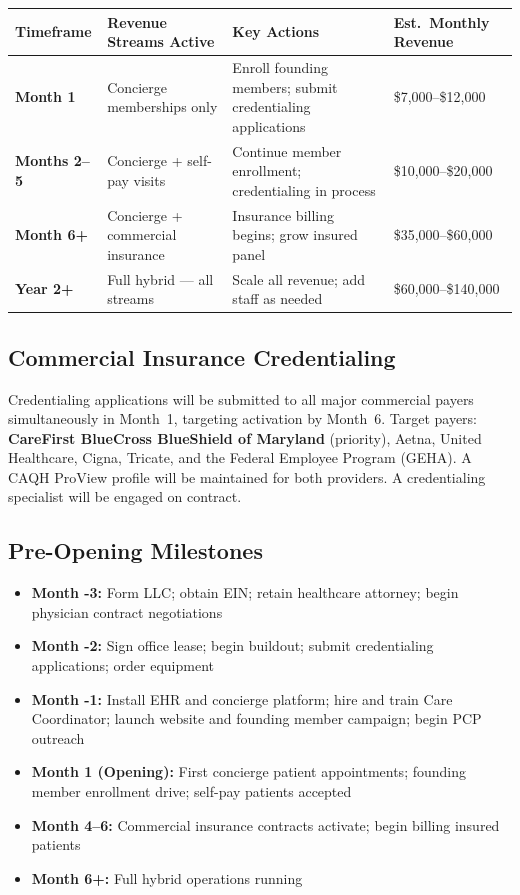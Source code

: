 \documentclass[11pt,letterpaper]{article}
\newcommand{\thead}[1]{\cellcolor{navy}\color{white}\bfseries\small #1}
\newcommand{\trow}{\rowcolor{rowshade}}
\begin{document}
\vspace{6pt}
\begin{tabularx}{\linewidth}{|>{\bfseries\small}p{2.0cm}|>{\small}p{3.2cm}|>{\small}X|>{\small}p{2.4cm}|}
\hline
\thead{Timeframe} & \thead{Revenue Streams Active} & \thead{Key Actions} & \thead{Est.\ Monthly Revenue} \\
\hline
\trow Month 1 & Concierge memberships only & Enroll founding members; submit credentialing applications & \$7,000--\$12,000 \\
Months 2--5 & Concierge + self-pay visits & Continue member enrollment; credentialing in process & \$10,000--\$20,000 \\
\trow Month 6+ & Concierge + commercial insurance & Insurance billing begins; grow insured panel & \$35,000--\$60,000 \\
Year 2+ & Full hybrid --- all streams & Scale all revenue; add staff as needed & \$60,000--\$140,000 \\
\hline
\end{tabularx}

\subsection{Commercial Insurance Credentialing}

Credentialing applications will be submitted to all major commercial payers simultaneously in Month~1, targeting activation by Month~6. Target payers: \textbf{CareFirst BlueCross BlueShield of Maryland} (priority), Aetna, United Healthcare, Cigna, Tricate, and the Federal Employee Program (GEHA). A CAQH ProView profile will be maintained for both providers. A credentialing specialist will be engaged on contract.

\subsection{Pre-Opening Milestones}

\begin{itemize}
  \item \textbf{Month -3:} Form LLC; obtain EIN; retain healthcare attorney; begin physician contract negotiations
  \item \textbf{Month -2:} Sign office lease; begin buildout; submit credentialing applications; order equipment
  \item \textbf{Month -1:} Install EHR and concierge platform; hire and train Care Coordinator; launch website and founding member campaign; begin PCP outreach
  \item \textbf{Month 1 (Opening):} First concierge patient appointments; founding member enrollment drive; self-pay patients accepted
  \item \textbf{Month 4--6:} Commercial insurance contracts activate; begin billing insured patients
  \item \textbf{Month 6+:} Full hybrid operations running
\end{itemize}
\end{document}

